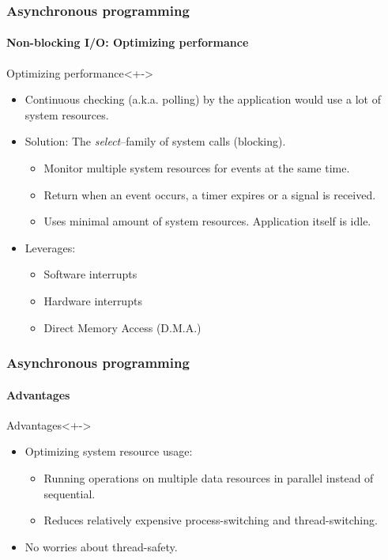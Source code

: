 \begin{frame}
	\frametitle{Asynchronous programming}
	\framesubtitle{Non-blocking I/O: Optimizing performance}

	\begin{block}{Optimizing performance}<+->
		\begin{itemize}[<+->]
			\item Continuous checking (a.k.a. polling) by the application would use a lot of system resources.
			\item Solution: The \emph{select}--family of system calls (blocking).
			\begin{itemize}[<+->]
				\item Monitor multiple system resources for events at the same time.
				\item Return when an event occurs, a timer expires or a signal is received.
				\item Uses minimal amount of system resources. Application itself is idle.
			\end{itemize}
			\item Leverages:
			\begin{itemize}[<+->]
				\item Software interrupts
				\item Hardware interrupts
				\item Direct Memory Access (D.M.A.)
			\end{itemize}
		\end{itemize}
	\end{block}
\end{frame}


\begin{frame}
	\frametitle{Asynchronous programming}
	\framesubtitle{Advantages}

	\begin{block}{Advantages}<+->
		\begin{itemize}[<+->]
			\item Optimizing system resource usage:
			\begin{itemize}[<+->]
				\item Running operations on multiple data resources in parallel instead of sequential.
				\item Reduces relatively expensive process-switching and thread-switching.
			\end{itemize}
			\item No worries about thread-safety.
		\end{itemize}
	\end{block}
\end{frame}


